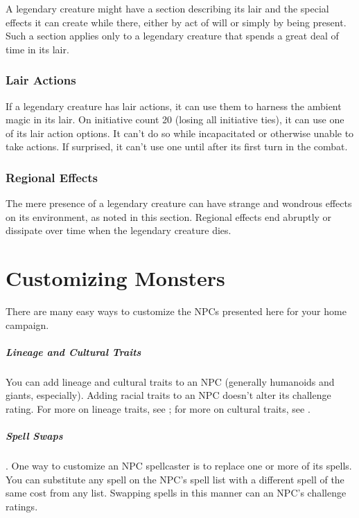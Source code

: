 A legendary creature might have a section describing its lair and the special effects it can create while there, either by act of will or simply by being present. Such a section applies only to a legendary creature that spends a great deal of time in its lair.

\subsubsection{Lair Actions}

If a legendary creature has lair actions, it can use them to harness the ambient magic in its lair. On initiative count 20 (losing all initiative ties), it can use one of its lair action options. It can't do so while incapacitated or otherwise unable to take actions. If surprised, it can't use one until after its first turn in the combat.

\subsubsection{Regional Effects}

The mere presence of a legendary creature can have strange and wondrous effects on its environment, as noted in this section. Regional effects end abruptly or dissipate over time when the legendary creature dies.

\section{Customizing Monsters}

There are many easy ways to customize the NPCs presented here for your home campaign.

\subparagraph*{Lineage and Cultural Traits} You can add lineage and cultural traits to an NPC (generally humanoids and giants, especially). Adding racial traits to an NPC doesn't alter its challenge rating. For more on lineage traits, see ; for more on cultural traits, see .

\subparagraph*{Spell Swaps}. One way to customize an NPC spellcaster is to replace one or more of its spells. You can substitute any spell on the NPC's spell list with a different spell of the same cost from any list. Swapping spells in this manner can an NPC's challenge ratings.

